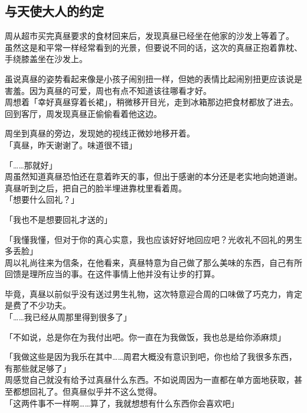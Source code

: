 \subsection{与天使大人的约定}

周从超市买完真昼要求的食材回来后，发现真昼已经坐在他家的沙发上等着了。\\

虽然这是和平常一样经常看到的光景，但要说不同的话，这次的真昼正抱着靠枕、手绕膝盖坐在沙发上。

虽说真昼的姿势看起来像是小孩子闹别扭一样，但她的表情比起闹别扭更应该说是害羞。因为真昼的可爱，周也有点不知道该往哪看才好。\\

周想着「幸好真昼穿着长裙」，稍微移开目光，走到冰箱那边把食材都放了进去。回到客厅，周发现真昼正偷偷看着他这边。

周坐到真昼的旁边，发现她的视线正微妙地移开着。\\

「真昼，昨天谢谢了。味道很不错」

「……那就好」\\

周虽然知道真昼恐怕还在意着昨天的事，但出于感谢的本分还是老实地向她道谢。真昼听到之后，把自己的脸半埋进靠枕里看着周。\\

「想要什么回礼？」

「我也不是想要回礼才送的」

「我懂我懂，但对于你的真心实意，我也应该好好地回应吧？光收礼不回礼的男生多丢脸」\\

周以礼尚往来为信条，在他看来，真昼特意为自己做了那么美味的东西，自己有所回馈是理所应当的事。在这件事情上他并没有让步的打算。

毕竟，真昼以前似乎没有送过男生礼物，这次特意迎合周的口味做了巧克力，肯定是费了不少功夫。\\

「……我已经从周那里得到很多了」

「不如说，总是你在为我付出吧。你一直在为我做饭，我也总是给你添麻烦」

「我做这些是因为我乐在其中……周君大概没有意识到吧，你也给了我很多东西，有那些就足够了」\\

周感觉自己就没有给予过真昼什么东西。不如说周因为一直都在单方面地获取，甚至都想回礼了。但真昼似乎并不这么觉得。\\

「这两件事不一样啊……算了，我就想想有什么东西你会喜欢吧」\\


